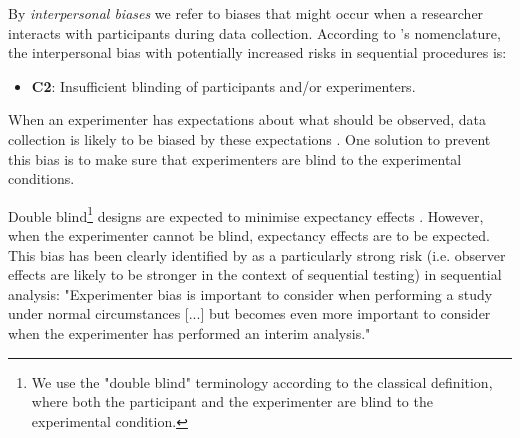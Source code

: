 \documentclass[a4paper,jou,natbib,floatsintext,donotrepeattitle]{apa6}
\begin{document}
By \textit{interpersonal biases} we refer to biases that might occur when a researcher interacts with participants during data collection. According to \cite{wicherts_degrees_2016-1}'s nomenclature, the interpersonal bias with potentially increased risks in sequential procedures is:

\begin{itemize}
    \item \textbf{C2}: Insufficient blinding of participants and/or experimenters.
\end{itemize}

When an experimenter has expectations about what should be observed, data collection is likely to be biased by these expectations \citep{orne_social_1962,rosenthal_social_1963-1,rosenthal_experimenter_1964,rosenthal_interpersonal_1978,zoble_interaction_1969,klein_low_2012,gilder_role_2018}. One solution to prevent this bias is to make sure that experimenters are blind to the experimental conditions. \par

Double blind\footnote{We use the "double blind" terminology according to the classical definition, where both the participant and the experimenter are blind to the experimental condition.} designs are expected to minimise expectancy effects \citep{klein_low_2012,gilder_role_2018}. However, when the experimenter cannot be blind, expectancy effects are to be expected. This bias has been clearly identified by \cite{lakens_performing_2014} as a particularly strong risk (i.e. observer effects are likely to be stronger in the context of sequential testing) in sequential analysis: "Experimenter bias is important to consider when performing a study under normal circumstances [...] but becomes even more important to consider when the experimenter has performed an interim analysis." \par
\end{document}
